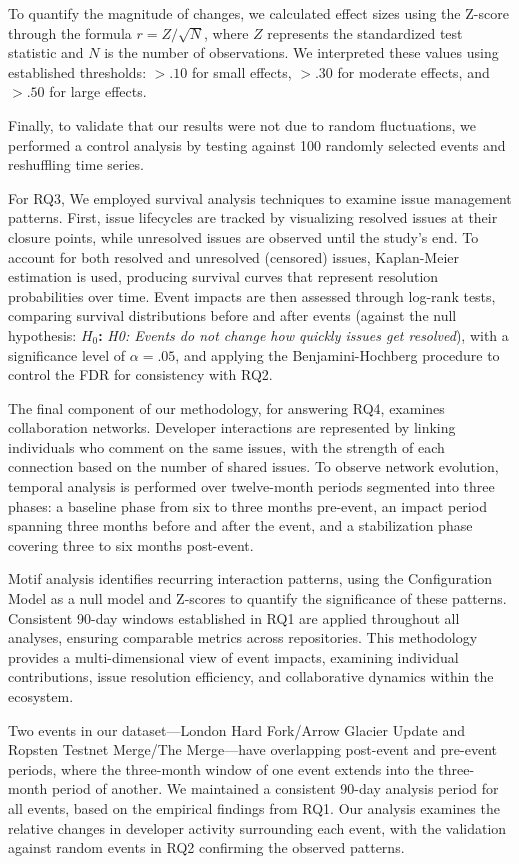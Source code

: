 To quantify the magnitude of changes, we calculated effect sizes using the Z-score through the formula $r = Z / \sqrt{N}$, where $Z$ represents the standardized test statistic and $N$ is the number of observations. We interpreted these values using established thresholds: $>.10$ for small effects, $>.30$ for moderate effects, and $>.50$ for large effects.

Finally, to validate that our results were not due to random fluctuations, we performed a control analysis by testing against 100 randomly selected events and reshuffling time series.

For RQ3, We employed survival analysis techniques to examine issue management patterns. First, issue lifecycles are tracked by visualizing resolved issues at their closure points, while unresolved issues are observed until the study’s end. To account for both resolved and unresolved (censored) issues, Kaplan-Meier estimation is used, producing survival curves that represent resolution probabilities over time. Event impacts are then assessed through log-rank tests, comparing survival distributions before and after events (against the null hypothesis: \textbf{$H_0$:} \textit{H0: Events do not change how quickly issues get resolved}), with a significance level of $\alpha = .05$, and applying the Benjamini-Hochberg procedure to control the FDR for consistency with RQ2.


The final component of our methodology, for answering RQ4, examines collaboration networks. Developer interactions are represented by linking individuals who comment on the same issues, with the strength of each connection based on the number of shared issues. To observe network evolution, temporal analysis is performed over twelve-month periods segmented into three phases: a baseline phase from six to three months pre-event, an impact period spanning three months before and after the event, and a stabilization phase covering three to six months post-event.

Motif analysis identifies recurring interaction patterns, using the Configuration Model as a null model and Z-scores to quantify the significance of these patterns. Consistent 90-day windows established in RQ1 are applied throughout all analyses, ensuring comparable metrics across repositories. This methodology provides a multi-dimensional view of event impacts, examining individual contributions, issue resolution efficiency, and collaborative dynamics within the ecosystem.

Two events in our dataset—London Hard Fork/Arrow Glacier Update and Ropsten Testnet Merge/The Merge—have overlapping post-event and pre-event periods, where the three-month window of one event extends into the three-month period of another. We maintained a consistent 90-day analysis period for all events, based on the empirical findings from RQ1. Our analysis examines the relative changes in developer activity surrounding each event, with the validation against random events in RQ2 confirming the observed patterns.


